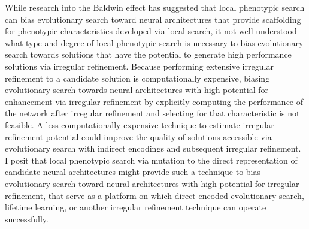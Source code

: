 While research into the Baldwin effect has suggested that local phenotypic search can bias evolutionary search toward neural architectures that provide scaffolding for phenotypic characteristics developed via local search, it not well understood what type and degree of local phenotypic search is necessary to bias evolutionary search towards solutions that have the potential to generate high performance solutions via irregular refinement. Because performing extensive irregular refinement to a candidate solution is computationally expensive, biasing evolutionary search towards neural architectures with high potential for enhancement via irregular refinement by explicitly computing the performance of the network after irregular refinement and selecting for that characteristic is not feasible. A less computationally expensive technique to estimate irregular refinement potential could improve the quality of solutions accessible via evolutionary search with indirect encodings and subsequent irregular refinement. I posit that local phenotypic search via mutation to the direct representation of candidate neural architectures might provide such a technique to bias evolutionary search toward neural architectures with high potential for irregular refinement, that serve as a platform on which direct-encoded evolutionary search, lifetime learning, or another irregular refinement technique can operate successfully. 

